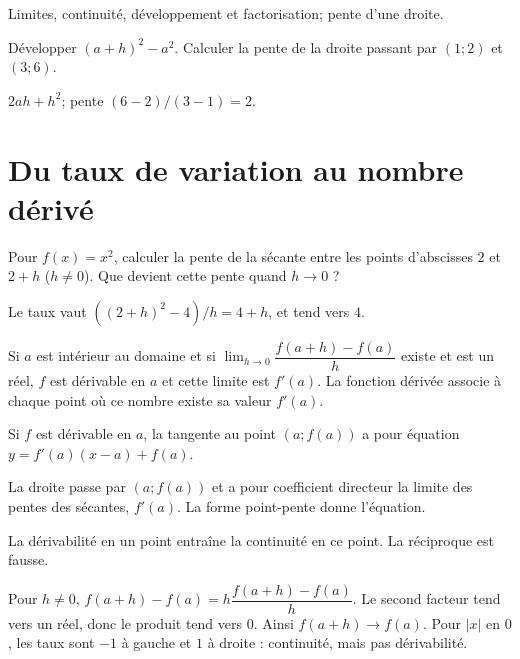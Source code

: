 \label{t11s-c04}
\begin{revision}Limites, continuité, développement et factorisation; pente d’une droite.\end{revision}
\begin{automatismes}\exo\label{t11s-c04-auto}Développer $(a+h)^2-a^2$. Calculer la pente de la droite passant par $(1;2)$ et $(3;6)$.\end{automatismes}
\begin{corrige}\label{sol-t11s-c04-auto}$2ah+h^2$; pente $(6-2)/(3-1)=2$.\end{corrige}

\section{Du taux de variation au nombre dérivé}
\begin{situation}
\exo\label{t11s-c04-act}Pour $f(x)=x^2$, calculer la pente de la sécante entre les points d’abscisses $2$ et $2+h$ ($h\ne0$). Que devient cette pente quand $h\to0$ ?
\end{situation}
\begin{corrige}\label{sol-t11s-c04-act}Le taux vaut $((2+h)^2-4)/h=4+h$, et tend vers $4$.\end{corrige}
\begin{definition}Si $a$ est intérieur au domaine et si $\lim_{h\to0}\dfrac{f(a+h)-f(a)}h$ existe et est un réel, $f$ est dérivable en $a$ et cette limite est $f'(a)$. La fonction dérivée associe à chaque point où ce nombre existe sa valeur $f'(a)$.\end{definition}
\begin{propriete}[tangente]Si $f$ est dérivable en $a$, la tangente au point $(a;f(a))$ a pour équation $y=f'(a)(x-a)+f(a)$.\end{propriete}
\begin{demonstration}La droite passe par $(a;f(a))$ et a pour coefficient directeur la limite des pentes des sécantes, $f'(a)$. La forme point-pente donne l’équation.\end{demonstration}
\begin{propriete}La dérivabilité en un point entraîne la continuité en ce point. La réciproque est fausse.\end{propriete}
\begin{demonstration}Pour $h\ne0$, $f(a+h)-f(a)=h\dfrac{f(a+h)-f(a)}h$. Le second facteur tend vers un réel, donc le produit tend vers $0$. Ainsi $f(a+h)\to f(a)$. Pour $|x|$ en $0$, les taux sont $-1$ à gauche et $1$ à droite : continuité, mais pas dérivabilité.\end{demonstration}
